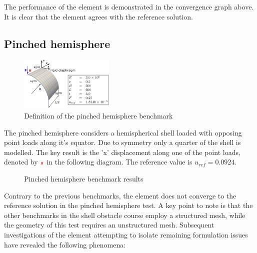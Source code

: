 \doublespacing

The performance of the element is demonstrated in the convergence graph above. It is clear that the element agrees with the reference solution.

\subsection{Pinched hemisphere}

\begin{figure}
	\centering
	\includegraphics[width=0.4\textwidth]{images/pinchedcylinder.png}
	\caption{Definition of the pinched hemisphere benchmark \cite{Bou13}}
\end{figure}

The pinched hemisphere considers a hemispherical shell loaded with opposing point loads along it's equator. Due to symmetry only a quarter of the shell is modelled. The key result is the 'x' displacement along one of the point loads, denoted by $\textcolor{red}{u}$ in the following diagram. The reference value is $u_{ref} =  0.0924$. 

\singlespacing
\begin{figure}[H]
	\caption{\label{ref_label_overall}Pinched hemisphere benchmark results}
\end{figure}

\doublespacing

Contrary to the previous benchmarks, the element does not converge to the reference solution in the pinched hemisphere test.  A key point to note is that the other benchmarks in the shell obstacle course employ a structured mesh, while the geometry of this test requires an unstructured mesh. Subsequent investigations of the element attempting to isolate remaining formulation issues have revealed the following phenomena:

